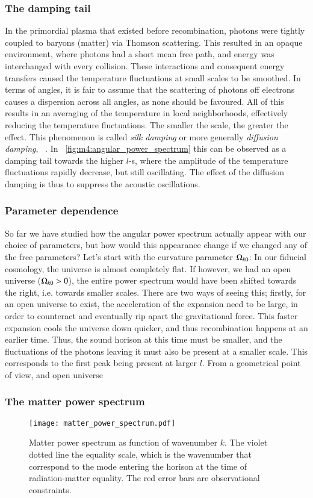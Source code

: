     \subsubsection{The damping tail}
        In the primordial plasma that existed before recombination, photons were tightly coupled to baryons (matter) via Thomson scattering. This resulted in an opaque environment, where photons had a short mean free path, and energy was interchanged with every collision. These interactions and consequent energy transfers caused the temperature fluctuations at small scales to be smoothed. In terms of angles, it is fair to assume that the scattering of photons off electrons causes a dispersion across all angles, as none should be favoured. All of this results in an averaging of the temperature in local neighborhoods, effectively reducing the temperature fluctuations. The smaller the scale, the greater the effect. This phenomenon is called \textit{silk damping} or more generally \textit{diffusion damping}, ~\cite{dodelson2020modern}. In ~\cref{fig:m4:angular_power_spectrum} this can be observed as a damping tail towards the higher $l$-s, where the amplitude of the temperature fluctuations rapidly decrease, but still oscillating. The effect of the diffusion damping is thus to suppress the acoustic oscillations. 

    \subsubsection{Parameter dependence}
        So far we have studied how the angular power spectrum actually appear with our choice of parameters, but how would this appearance change if we changed any of the free parameters? Let's start with the curvature parameter $\Omega_{k0}$: In our fiducial cosmology, the universe is almost completely flat. If however, we had an open universe ($\Omega_{k0}>0$), the entire power spectrum would have been shifted towards the right, i.e. towards smaller scales. There are two ways of seeing this; firstly, for an open universe to exist, the acceleration of the expansion need to be large, in order to counteract and eventually rip apart the gravitational force. This faster expansion cools the universe down quicker, and thus recombination happens at an earlier time. Thus, the sound horison at this time must be smaller, and the fluctuations of the photons leaving it must also be present at a smaller scale. This corresponds to the first peak being present at larger $l$. From a geometrical point of view, and open universe 

    \subsubsection{The matter power spectrum}
    
    \begin{figure}
        \texttt{[image: matter\_power\_spectrum.pdf]}
        \caption{Matter power spectrum as function of wavenumber $k$. The violet dotted line the equality scale, which is the wavenumber that correspond to the mode entering the horison at the time of radiation-matter equality. The red error bars are observational constraints.}
        \label{fig:m4:matter_power_spectrum}
    \end{figure}